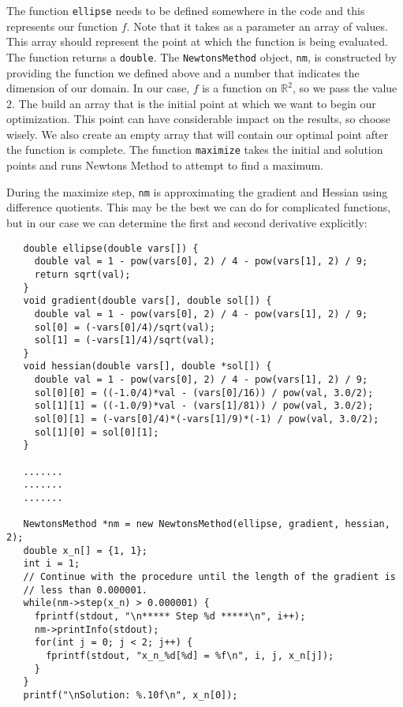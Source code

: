 \documentclass{amsart}
\theoremstyle{plain}
\numberwithin{equation}{section}
\begin{document}
The function \verb|ellipse| needs to be defined somewhere in the code and this represents our function $f$. Note that it takes as a parameter an array of values. This array should represent the point at which the function is being evaluated. The function returns a \texttt{double}. The \verb|NewtonsMethod| object, \verb|nm|, is constructed by providing the function we defined above and a number that indicates the dimension of our domain. In our case, $f$ is a function on $\mathbb{R}^2$, so we pass the value $2$. The build an array that is the initial point at which we want to begin our optimization. This point can have considerable impact on the results, so choose wisely. We also create an empty array that will contain our optimal point after the function is complete. The function \verb|maximize| takes the initial and solution points and runs Newtons Method to attempt to find a maximum. \newline

During the maximize step, \verb|nm| is approximating the gradient and Hessian using difference quotients. This may be the best we can do for complicated functions, but in our case we can determine the first and second derivative explicitly: \newline

\begin{verbatim}
   double ellipse(double vars[]) {
     double val = 1 - pow(vars[0], 2) / 4 - pow(vars[1], 2) / 9;
     return sqrt(val);
   }
   void gradient(double vars[], double sol[]) {
   	 double val = 1 - pow(vars[0], 2) / 4 - pow(vars[1], 2) / 9;
     sol[0] = (-vars[0]/4)/sqrt(val);
     sol[1] = (-vars[1]/4)/sqrt(val);
   }
   void hessian(double vars[], double *sol[]) {
     double val = 1 - pow(vars[0], 2) / 4 - pow(vars[1], 2) / 9;
   	 sol[0][0] = ((-1.0/4)*val - (vars[0]/16)) / pow(val, 3.0/2);
   	 sol[1][1] = ((-1.0/9)*val - (vars[1]/81)) / pow(val, 3.0/2);
   	 sol[0][1] = (-vars[0]/4)*(-vars[1]/9)*(-1) / pow(val, 3.0/2);
   	 sol[1][0] = sol[0][1];
   }

   .......
   .......
   .......
	 
   NewtonsMethod *nm = new NewtonsMethod(ellipse, gradient, hessian, 2);
   double x_n[] = {1, 1};
   int i = 1;
   // Continue with the procedure until the length of the gradient is 
   // less than 0.000001.
   while(nm->step(x_n) > 0.000001) {
     fprintf(stdout, "\n***** Step %d *****\n", i++);
     nm->printInfo(stdout);
     for(int j = 0; j < 2; j++) {
       fprintf(stdout, "x_n_%d[%d] = %f\n", i, j, x_n[j]);
     }
   }
   printf("\nSolution: %.10f\n", x_n[0]);
\end{verbatim}
\end{document}
